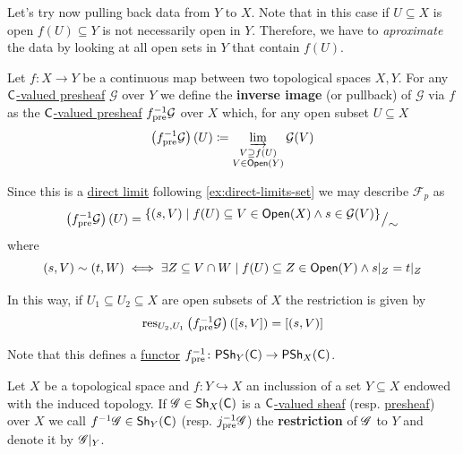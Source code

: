 \documentclass[../../main]{subfiles}
\begin{document}
Let's try now pulling back data from \(Y\) to \(X\).
Note that in this case if \(U \subseteq X\) is open \(f(U) \subseteq Y\) is not necessarily open in \(Y\).
Therefore, we have to \textit{aproximate} the data by looking at all open sets in \(Y\) that contain \(f(U)\).
\begin{definition}\label{def:inverse-image-presheaf}
  Let \(f\colon X \to Y\) be a continuous map between two topological spaces \(X, Y\).
  For any \hyperref[def:presheaf]{\(\mathsf{C}\)-valued presheaf} \(\mathcal{G}\) over \(Y\) we define the \textbf{inverse image} (or pullback) of \(\mathcal{G}\) via \(f\) as the \hyperref[def:presheaf]{\(\mathsf{C}\)-valued presheaf} \(f_{\operatorname*{pre}}^{-1}\mathcal{G}\) over \(X\) which, for any open subset \(U \subseteq X\)
  \begin{equation*}
    \left( f_{\operatorname*{pre}}^{-1}\mathcal{G} \right)(U) \coloneq \varinjlim_{\substack{V \supseteq f(U) \\ V \in \mathsf{Open}(Y) }} \mathcal{G}(V)
  \end{equation*}

  Since this is a \hyperref[def:direct-limit]{direct limit} following \autoref{ex:direct-limits-set} we may describe \(\mathcal{F}_{p}\) as
  \begin{equation*}
    \left( f_{\operatorname*{pre}}^{-1}\mathcal{G} \right)(U) = {^{\textstyle \{(s, V) \mid f(U) \subseteq V \in \mathsf{Open}(X) \land s \in \mathcal{G}(V)\}}\big/_{\textstyle \sim}}
  \end{equation*}
  where
  \begin{equation*}
    (s, V) \sim (t, W) \iff \exists Z \subseteq V \cap W \mid f(U) \subseteq Z \in \mathsf{Open}(Y) \land s|_{Z} = t|_{Z}
  \end{equation*}

  In this way, if \(U_{1} \subseteq U_{2} \subseteq X\) are open subsets of \(X\) the restriction is given by
  \begin{equation*}
    \operatorname{res}_{U_{2}, U_{1}} \left(f_{\operatorname*{pre}}^{-1}\mathcal{G} \right)([s, V]) = [(s, V)]
  \end{equation*}
  
  Note that this defines a \hyperref[def:functor]{functor} \(f_{\operatorname*{pre}}^{-1}\colon \mathsf{PSh}_{Y}(\mathsf{C}) \to \mathsf{PSh}_{X}(\mathsf{C})\).
\end{definition}

\begin{notation}
  Let \(X\) be a topological space and \(f\colon Y \hookrightarrow X\) an inclussion of a set \(Y \subseteq X\) endowed with the induced topology.
  If \(\mathscr{G} \in \mathsf{Sh}_{X}(\mathsf{C})\) is a \hyperref[def:sheaf]{\(\mathsf{C}\)-valued sheaf} (resp. \hyperref[def:presheaf]{presheaf}) over \(X\) we call \(f^{-1}\mathscr{G} \in \mathsf{Sh}_{Y}(\mathsf{C})\) (resp. \(j_{\operatorname*{pre}}^{-1}\mathscr{G}\)) the \textbf{restriction} of \(\mathscr{G}\) to \(Y\) and denote it by \(\mathscr{G}|_{Y}\).
\end{notation}
\end{document}
